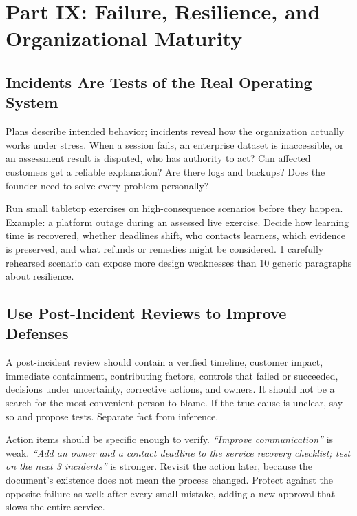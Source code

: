 \section*{Part IX: Failure, Resilience, and Organizational Maturity}

\subsection{Incidents Are Tests of the Real Operating System}
\label{sec:incidents_test_operating_system}

Plans describe intended behavior; incidents reveal how the organization actually works under stress. When a session fails, an enterprise dataset is inaccessible, or an assessment result is disputed, who has authority to act? Can affected customers get a reliable explanation? Are there logs and backups? Does the founder need to solve every problem personally?

Run small tabletop exercises on high-consequence scenarios before they happen. Example: a platform outage during an assessed live exercise. Decide how learning time is recovered, whether deadlines shift, who contacts learners, which evidence is preserved, and what refunds or remedies might be considered. 1 carefully rehearsed scenario can expose more design weaknesses than 10 generic paragraphs about resilience.

\subsection{Use Post-Incident Reviews to Improve Defenses}
\label{sec:post_incident_reviews}

A post-incident review should contain a verified timeline, customer impact, immediate containment, contributing factors, controls that failed or succeeded, decisions under uncertainty, corrective actions, and owners. It should not be a search for the most convenient person to blame. If the true cause is unclear, say so and propose tests. Separate fact from inference.

Action items should be specific enough to verify. \textit{``Improve communication''} is weak. \textit{``Add an owner and a contact deadline to the service recovery checklist; test on the next 3 incidents''} is stronger. Revisit the action later, because the document's existence does not mean the process changed. Protect against the opposite failure as well: after every small mistake, adding a new approval that slows the entire service.

